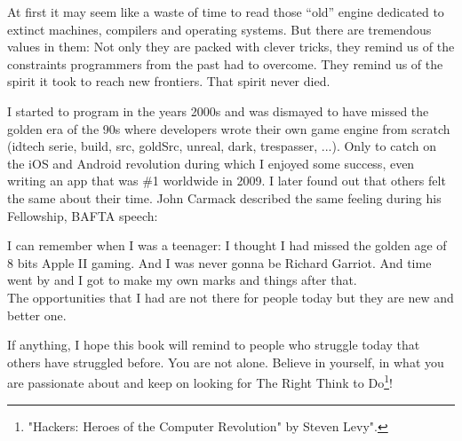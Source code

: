 \documentclass[book.tex]{subfiles}
\begin{document}
\bigskip

At first it may seem like a waste of time to read those ``old'' engine dedicated to extinct machines, compilers and operating systems. But there are tremendous values in them: Not only they are packed with clever tricks, they remind us of the constraints programmers from the past had to overcome. They remind us of the spirit it took to reach new frontiers. That spirit never died.\\
\par
I started to program in the years 2000s and was dismayed to have missed the golden era of the 90s where developers wrote their own game engine from scratch (idtech serie, build, src, goldSrc, unreal, dark, trespasser, ...). Only to catch on the iOS and Android revolution during which I enjoyed some success, even writing an app that was \#1 worldwide in 2009. I later found out that others felt the same about their time. John Carmack described the same feeling during his Fellowship, BAFTA speech:\\
\par
 \begin{fancyquotes}
I can remember when I was a teenager: I thought I had missed the golden age of 8 bits Apple II gaming. And I was never gonna be Richard Garriot. And time went by and I got to make
    my own marks and things after that.\\
    
    The opportunities that I had are not there for people today but they are new and better one.
 \bigskip
 \end{fancyquotes}

\par
 If anything, I hope this book will remind to people who struggle today that others have struggled before. You are not alone. Believe in yourself, in what you are passionate about and keep on looking for The Right Think to Do\footnote{"Hackers: Heroes of the Computer Revolution" by Steven Levy".}!\\



\end{document}
